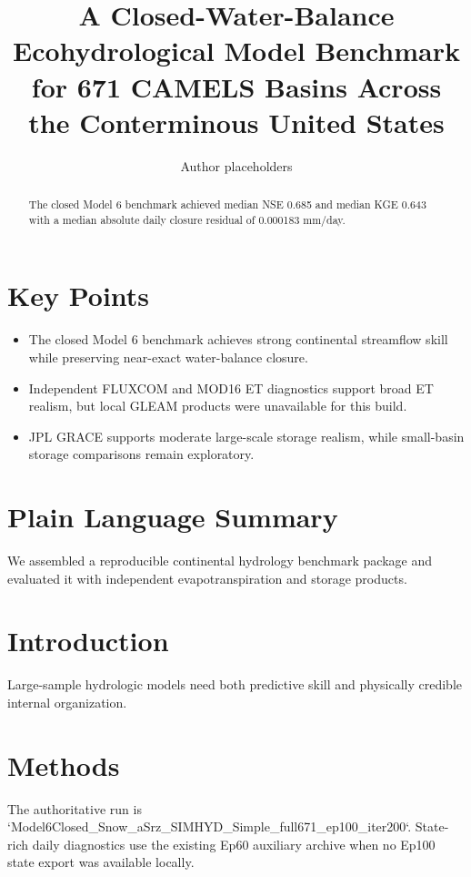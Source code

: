 \documentclass[12pt]{article}
\title{A Closed-Water-Balance Ecohydrological Model Benchmark for 671 CAMELS Basins Across the Conterminous United States}
\author{Author placeholders}
\date{}
\begin{document}
\maketitle
\section*{Key Points}
\begin{itemize}
\item The closed Model 6 benchmark achieves strong continental streamflow skill while preserving near-exact water-balance closure.
\item Independent FLUXCOM and MOD16 ET diagnostics support broad ET realism, but local GLEAM products were unavailable for this build.
\item JPL GRACE supports moderate large-scale storage realism, while small-basin storage comparisons remain exploratory.
\end{itemize}
\begin{abstract}
The closed Model 6 benchmark achieved median NSE 0.685 and median KGE 0.643 with a median absolute daily closure residual of 0.000183 mm/day.
\end{abstract}
\section*{Plain Language Summary}
We assembled a reproducible continental hydrology benchmark package and evaluated it with independent evapotranspiration and storage products.
\section{Introduction}
Large-sample hydrologic models need both predictive skill and physically credible internal organization.
\section{Methods}
The authoritative run is `Model6Closed_Snow_aSrz_SIMHYD_Simple_full671_ep100_iter200`. State-rich daily diagnostics use the existing Ep60 auxiliary archive when no Ep100 state export was available locally.
\end{document}
